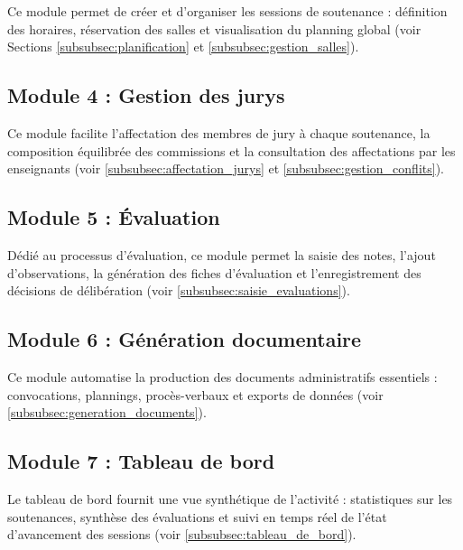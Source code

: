\documentclass[12pt,a4paper]{article}
\begin{document}
Ce module permet de créer et d'organiser les sessions de soutenance : définition
des horaires, réservation des salles et visualisation du planning global (voir
Sections \ref{subsubsec:planification} et \ref{subsubsec:gestion_salles}).

\subsection{Module 4 : Gestion des jurys}
\label{subsec:module_jurys}

Ce module facilite l'affectation des membres de jury à chaque soutenance, la
composition équilibrée des commissions et la consultation des affectations par
les enseignants (voir \ref{subsubsec:affectation_jurys} et \ref{subsubsec:gestion_conflits}).

\subsection{Module 5 : Évaluation}
\label{subsec:module_evaluation}

Dédié au processus d'évaluation, ce module permet la saisie des notes, l'ajout
d'observations, la génération des fiches d'évaluation et l'enregistrement des
décisions de délibération (voir \ref{subsubsec:saisie_evaluations}).

\subsection{Module 6 : Génération documentaire}
\label{subsec:module_documents}

Ce module automatise la production des documents administratifs essentiels :
convocations, plannings, procès-verbaux et exports de données (voir
\ref{subsubsec:generation_documents}).

\subsection{Module 7 : Tableau de bord}
\label{subsec:module_dashboard}

Le tableau de bord fournit une vue synthétique de l'activité : statistiques sur
les soutenances, synthèse des évaluations et suivi en temps réel de l'état
d'avancement des sessions (voir \ref{subsubsec:tableau_de_bord}).

\end{document}
